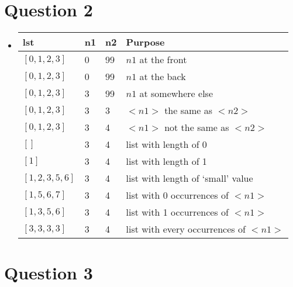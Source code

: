 \documentclass[12pt]{article}
\begin{document}
\section*{Question 2}
\begin{itemize}
    \item

    \begin{tabular}{|p{5cm}|p{1cm}|p{1cm}|p{6cm}|}
        \hline
        \textbf{lst} & \textbf{n1} & \textbf{n2} & \textbf{Purpose}\\
        \hline
        $[0,1,2,3]$ & 0 & 99 & $n1$ at the front\\
        \hline
        $[0,1,2,3]$ & 0 & 99 & $n1$ at the back\\
        \hline
        $[0,1,2,3]$ & 3 & 99 & $n1$ at somewhere else\\
        \hline
        $[0,1,2,3]$ & 3 & 3 & $<n1>$ the same as $<n2>$\\
        \hline
        $[0,1,2,3]$ & 3 & 4 & $<n1>$ not the same as $<n2>$\\
        \hline
        $[]$ & 3 & 4 & list with length of 0\\
        \hline
        $[1]$ & 3 & 4 & list with length of 1\\
        \hline
        $[1,2,3,5,6]$ & 3 & 4 & list with length of `small' value\\
        \hline
        $[1,5,6,7]$ & 3 & 4 & list with 0 occurrences of $<n1>$\\
        \hline
        $[1,3,5,6]$ & 3 & 4 & list with 1 occurrences of $<n1>$\\
        \hline
        $[3,3,3,3]$ & 3 & 4 & list with every occurrences of $<n1>$\\
        \hline
    \end{tabular}
\end{itemize}

\section*{Question 3}
\end{document}
